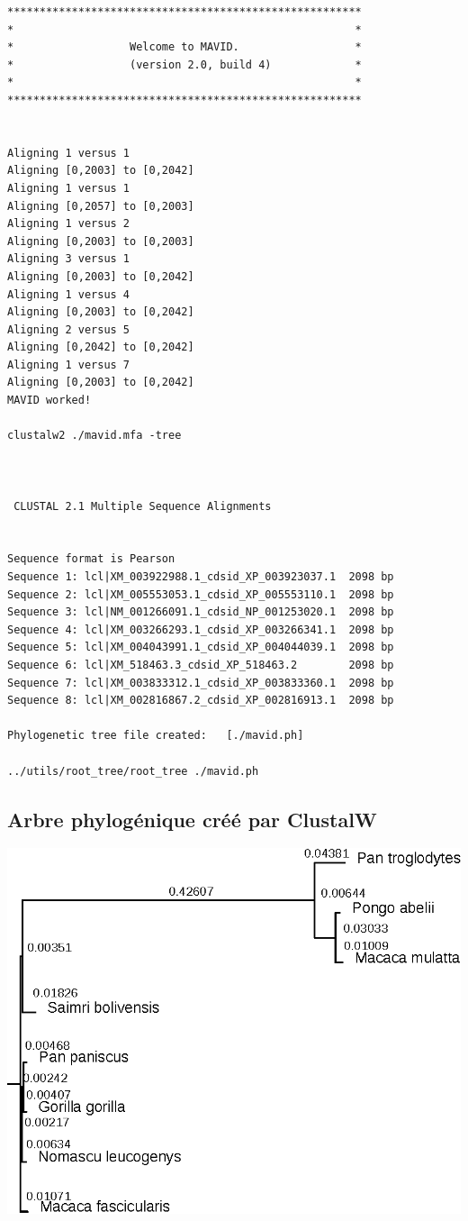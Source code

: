 \documentclass[10.8pt]{article} %
\begin{document}
\begin{verbatim}
*******************************************************
*                                                     *
*                  Welcome to MAVID.                  *
*                  (version 2.0, build 4)             *
*                                                     *
*******************************************************


Aligning 1 versus 1
Aligning [0,2003] to [0,2042]
Aligning 1 versus 1
Aligning [0,2057] to [0,2003]
Aligning 1 versus 2
Aligning [0,2003] to [0,2003]
Aligning 3 versus 1
Aligning [0,2003] to [0,2042]
Aligning 1 versus 4
Aligning [0,2003] to [0,2042]
Aligning 2 versus 5
Aligning [0,2042] to [0,2042]
Aligning 1 versus 7
Aligning [0,2003] to [0,2042]
MAVID worked!

clustalw2 ./mavid.mfa -tree



 CLUSTAL 2.1 Multiple Sequence Alignments


Sequence format is Pearson
Sequence 1: lcl|XM_003922988.1_cdsid_XP_003923037.1  2098 bp
Sequence 2: lcl|XM_005553053.1_cdsid_XP_005553110.1  2098 bp
Sequence 3: lcl|NM_001266091.1_cdsid_NP_001253020.1  2098 bp
Sequence 4: lcl|XM_003266293.1_cdsid_XP_003266341.1  2098 bp
Sequence 5: lcl|XM_004043991.1_cdsid_XP_004044039.1  2098 bp
Sequence 6: lcl|XM_518463.3_cdsid_XP_518463.2        2098 bp
Sequence 7: lcl|XM_003833312.1_cdsid_XP_003833360.1  2098 bp
Sequence 8: lcl|XM_002816867.2_cdsid_XP_002816913.1  2098 bp

Phylogenetic tree file created:   [./mavid.ph]

../utils/root_tree/root_tree ./mavid.ph
\end{verbatim}

\subsection{Arbre phylogénique créé par ClustalW}\label{20}
\includegraphics{annexes/q4_cds/clustalw/foxp4_ortho.eps}
\end{document}
